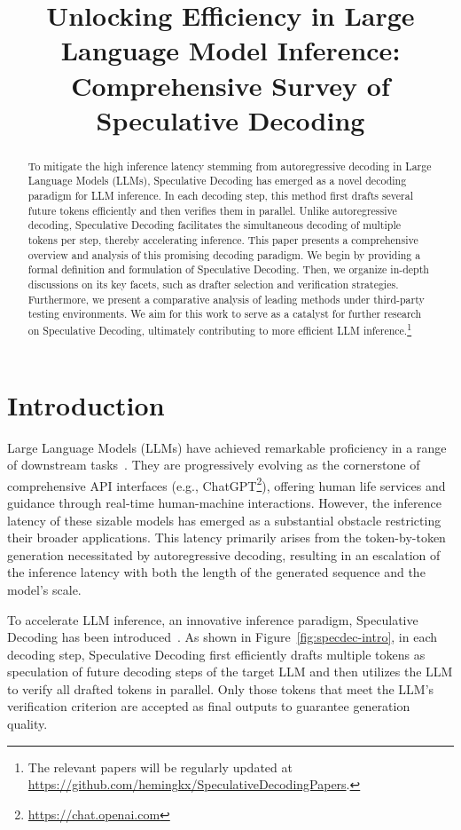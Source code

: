 \title{Unlocking Efficiency in Large Language Model Inference: Comprehensive Survey of Speculative Decoding}

\begin{abstract}
To mitigate the high inference latency stemming from autoregressive decoding in Large Language Models (LLMs), Speculative Decoding has emerged as a novel decoding paradigm for LLM inference. In each decoding step, this method first drafts several future tokens efficiently and then verifies them in parallel. Unlike autoregressive decoding, Speculative Decoding facilitates the simultaneous decoding of multiple tokens per step, thereby accelerating inference. This paper presents a comprehensive overview and analysis of this promising decoding paradigm. We begin by providing a formal definition and formulation of Speculative Decoding. Then, we organize in-depth discussions on its key facets, such as drafter selection and verification strategies. Furthermore, we present a comparative analysis of leading methods under third-party testing environments. We aim for this work to serve as a catalyst for further research on Speculative Decoding, ultimately contributing to more efficient LLM inference.\footnote{The relevant papers will be regularly updated at \url{https://github.com/hemingkx/SpeculativeDecodingPapers}.}
\end{abstract}

\section{Introduction}
Large Language Models (LLMs) have achieved remarkable proficiency in a range of downstream tasks~\cite{openai:2023gpt4, Hugo:2023llama, Hugo:2023llama2, vicuna2023, mistral}. They are progressively evolving as the cornerstone of comprehensive API interfaces (e.g., ChatGPT\footnote{\url{https://chat.openai.com}}), offering human life services and guidance through real-time human-machine interactions. However, the inference latency of these sizable models has emerged as a substantial obstacle restricting their broader applications. This latency primarily arises from the token-by-token generation necessitated by autoregressive decoding, resulting in an escalation of the inference latency with both the length of the generated sequence and the model's scale.

To accelerate LLM inference, an innovative inference paradigm, Speculative Decoding has been introduced~\cite{Stern:2018blockwise, xia:2022specdec, Leviathan:2023specdec, Chen:2023specsampling}. As shown in Figure~\ref{fig:specdec-intro}, in each decoding step, Speculative Decoding first efficiently drafts multiple tokens as speculation of future decoding steps of the target LLM and then utilizes the LLM to verify all drafted tokens in parallel. Only those tokens that meet the LLM's verification criterion are accepted as final outputs to guarantee generation quality. 

